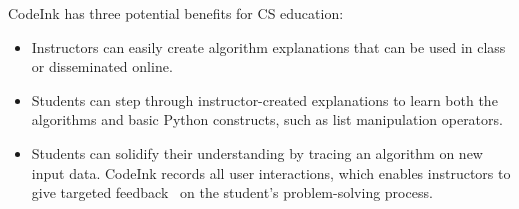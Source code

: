 CodeInk has three potential benefits for CS education:

\begin{itemize}\itemsep2pt

\item Instructors can easily create algorithm explanations that can be
used in class or disseminated online.

\item Students can step through instructor-created explanations to learn
both the algorithms and basic Python constructs, such as list
manipulation operators.

\item Students can solidify their understanding by tracing an algorithm on new
input data. CodeInk records all user interactions, which enables instructors to
give targeted feedback~\cite{Balzer1989} on the student's problem-solving
process.

\end{itemize}
